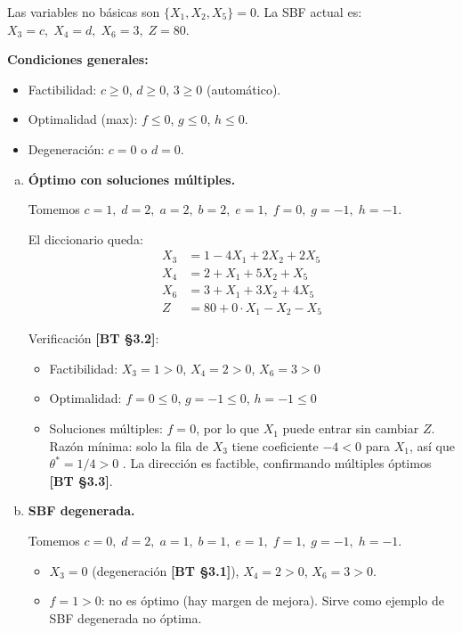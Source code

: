 \documentclass{article}
\begin{document}
Las variables no básicas son $\{X_1, X_2, X_5\} = 0$. La SBF actual es:
$X_3 = c,\; X_4 = d,\; X_6 = 3,\; Z = 80$.

\textbf{Condiciones generales:}
\begin{itemize}
  \item Factibilidad: $c \geq 0$, $d \geq 0$, $3 \geq 0$ (automático).
  \item Optimalidad (max): $f \leq 0$, $g \leq 0$, $h \leq 0$.
  \item Degeneración: $c = 0$ o $d = 0$.
\end{itemize}

\begin{enumerate}[a)]

\item \textbf{Óptimo con soluciones múltiples.}

Tomemos $c=1,\; d=2,\; a=2,\; b=2,\; e=1,\; f=0,\; g=-1,\; h=-1$.

El diccionario queda:
\begin{align*}
X_3 &= 1 - 4X_1 + 2X_2 + 2X_5 \\
X_4 &= 2 + X_1 + 5X_2 + X_5 \\
X_6 &= 3 + X_1 + 3X_2 + 4X_5 \\
Z   &= 80 + 0 \cdot X_1 - X_2 - X_5
\end{align*}

Verificación \textbf{[BT §3.2]}:
\begin{itemize}
  \item Factibilidad: $X_3=1>0$, $X_4=2>0$, $X_6=3>0$ \checkmark
  \item Optimalidad: $f=0\leq 0$, $g=-1\leq 0$, $h=-1\leq 0$ \checkmark
  \item Soluciones múltiples: $f=0$, por lo que $X_1$ puede entrar sin cambiar $Z$. Razón mínima: solo la fila de $X_3$ tiene coeficiente $-4 < 0$ para $X_1$, así que $\theta^* = 1/4 > 0$ \checkmark. La dirección es factible, confirmando múltiples óptimos \textbf{[BT §3.3]}.
\end{itemize}

\item \textbf{SBF degenerada.}

Tomemos $c=0,\; d=2,\; a=1,\; b=1,\; e=1,\; f=1,\; g=-1,\; h=-1$.

\begin{itemize}
  \item $X_3 = 0$ (degeneración \textbf{[BT §3.1]}), $X_4=2>0$, $X_6=3>0$.
  \item $f=1>0$: no es óptimo (hay margen de mejora). Sirve como ejemplo de SBF degenerada no óptima.
\end{itemize}


\end{enumerate}
\end{document}

